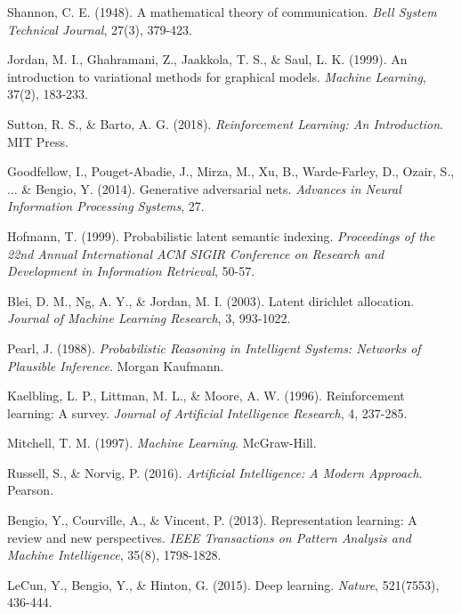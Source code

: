\documentclass[12pt,a4paper]{article}
\begin{document}
\begin{thebibliography}{99}

Shannon, C. E. (1948). A mathematical theory of communication. \textit{Bell System Technical Journal}, 27(3), 379-423.

Jordan, M. I., Ghahramani, Z., Jaakkola, T. S., \& Saul, L. K. (1999). An introduction to variational methods for graphical models. \textit{Machine Learning}, 37(2), 183-233.

Sutton, R. S., \& Barto, A. G. (2018). \textit{Reinforcement Learning: An Introduction}. MIT Press.

Goodfellow, I., Pouget-Abadie, J., Mirza, M., Xu, B., Warde-Farley, D., Ozair, S., ... \& Bengio, Y. (2014). Generative adversarial nets. \textit{Advances in Neural Information Processing Systems}, 27.

Hofmann, T. (1999). Probabilistic latent semantic indexing. \textit{Proceedings of the 22nd Annual International ACM SIGIR Conference on Research and Development in Information Retrieval}, 50-57.

Blei, D. M., Ng, A. Y., \& Jordan, M. I. (2003). Latent dirichlet allocation. \textit{Journal of Machine Learning Research}, 3, 993-1022.

Pearl, J. (1988). \textit{Probabilistic Reasoning in Intelligent Systems: Networks of Plausible Inference}. Morgan Kaufmann.

Kaelbling, L. P., Littman, M. L., \& Moore, A. W. (1996). Reinforcement learning: A survey. \textit{Journal of Artificial Intelligence Research}, 4, 237-285.

Mitchell, T. M. (1997). \textit{Machine Learning}. McGraw-Hill.

Russell, S., \& Norvig, P. (2016). \textit{Artificial Intelligence: A Modern Approach}. Pearson.

Bengio, Y., Courville, A., \& Vincent, P. (2013). Representation learning: A review and new perspectives. \textit{IEEE Transactions on Pattern Analysis and Machine Intelligence}, 35(8), 1798-1828.

LeCun, Y., Bengio, Y., \& Hinton, G. (2015). Deep learning. \textit{Nature}, 521(7553), 436-444.


\end{thebibliography}
\end{document}
